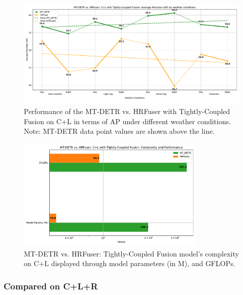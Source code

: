 \documentclass[report.tex]{subfiles}
\begin{document}
    \begin{figure}[h!]
        \centering
        \includegraphics[width=1.0\textwidth]{images/results/hrfuser_vs_mtdetr/cl/ap.pdf}
        \caption{Performance of the MT-DETR vs. HRFuser with Tightly-Coupled Fusion on C+L in terms of AP under different weather conditions. Note: MT-DETR data point values are shown above the line.}
        \label{fig:hrfuser_vs_mtdetr_cl_ap}
    \end{figure}
    \begin{figure}[h!]
        \centering
        \includegraphics[width=0.8\textwidth]{images/results/hrfuser_vs_mtdetr/cl/model_complexity.pdf}
        \caption{MT-DETR vs. HRFuser: Tightly-Coupled Fusion model's complexity on C+L displayed through model parameters (in M), and GFLOPs.}
        \label{fig:hrfuser_vs_mtdetr_cl_model_complexity}
    \end{figure}

    \FloatBarrier
    \subsubsection{Compared on C+L+R}
\end{document}
